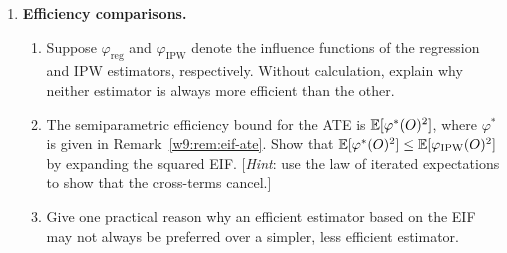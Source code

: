 \documentclass[master.tex]{subfiles}
\begin{document}
\begin{enumerate}
\item \textbf{Efficiency comparisons.}
  \begin{enumerate}
    \item Suppose $\varphi_{\mathrm{reg}}$ and
      $\varphi_{\mathrm{IPW}}$ denote the influence functions of the
      regression and IPW estimators, respectively.  Without
      calculation, explain why neither estimator is always more
      efficient than the other.
    \item The semiparametric efficiency bound for the ATE is
      $\mathbb{E}[\varphi^*(O)^2]$, where $\varphi^*$ is given in
      Remark~\ref{w9:rem:eif-ate}.  Show that
      $\mathbb{E}[\varphi^*(O)^2] \leq \mathbb{E}[\varphi_{\mathrm{IPW}}(O)^2]$ by
      expanding the squared EIF.  [\emph{Hint}: use the law of
      iterated expectations to show that the cross-terms cancel.]
    \item Give one practical reason why an efficient estimator based
      on the EIF may not always be preferred over a simpler, less
      efficient estimator.
  \end{enumerate}

\end{enumerate}

\ifSubfilesClassLoaded{%
  
  
}{}
\end{document}
